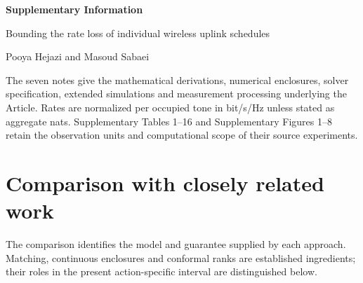 \documentclass[10pt,letterpaper]{article}
\begin{document}
\begin{center}
{\Large\bfseries Supplementary Information\par}
\medskip
{\large Bounding the rate loss of individual wireless uplink schedules\par}
\medskip
Pooya Hejazi and Masoud Sabaei
\end{center}
\noindent The seven notes give the mathematical derivations, numerical enclosures, solver specification, extended simulations and measurement processing underlying the Article. Rates are normalized per occupied tone in bit/s/Hz unless stated as aggregate nats. Supplementary Tables 1--16 and Supplementary Figures 1--8 retain the observation units and computational scope of their source experiments.
\section{Comparison with closely related work}
\label{suppnote:literature}
The comparison identifies the model and guarantee supplied by each approach. Matching, continuous enclosures and conformal ranks are established ingredients; their roles in the present action-specific interval are distinguished below.
\end{document}
